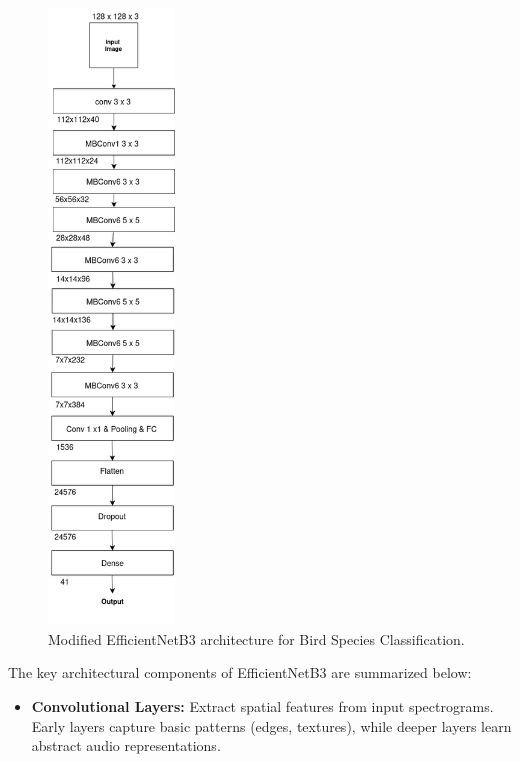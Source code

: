 \begin{itemize}
            \begin{figure}[h!]
                  \centering
                  \includegraphics[width=0.3\textwidth]{images/MajorProject-efficientNetB3 architecture.png}
                  \caption{Modified EfficientNetB3 architecture for Bird Species Classification.}
                  \label{fig:efficientnetb3}
            \end{figure}
            
            The key architectural components of EfficientNetB3 are summarized below:
            
            \begin{itemize}
                  \item \textbf{Convolutional Layers:} Extract spatial features from input spectrograms. Early layers capture basic patterns (edges, textures), while deeper layers learn abstract audio representations.
                  

\end{itemize}
\end{itemize}
